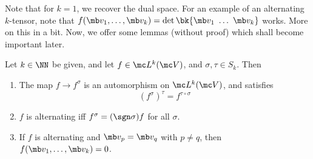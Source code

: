 \documentclass{fkbook}
\theoremstyle{snazzydefinition}
\begin{document}
  Note that for $k=1$, we recover the dual space. For an example of an
  alternating $k$-tensor, note that $f(\mb v_1, \ldots, \mb v_k) =
  \det \bk{\mb v_1\ \ldots\ \mb v_k}$ works. More on this in a bit.
  Now, we offer some lemmas (without proof) which shall become
  important later.
  \begin{lemma}
    Let $k \in \NN$ be given, and let $f \in \mc L^k(\mc V)$, and
    $\sigma, \tau \in S_k$. Then
    \begin{enumerate}
      \item The map $f \to f^\sigma$ is an automorphism on $\mc
        L^k(\mc V)$, and satisfies
        \[
          (f^\sigma)^\tau = f^{\tau \circ \sigma}
        \]
      \item $f$ is alternating iff $f^\sigma = (\sgn \sigma)f$ for all
        $\sigma$.
      \item If $f$ is alternating and $\mb v_p = \mb v_q$ with $p \neq
        q$, then $f(\mb v_1, \ldots, \mb v_k) = 0$.
    \end{enumerate}
  \end{lemma}
\end{document}
